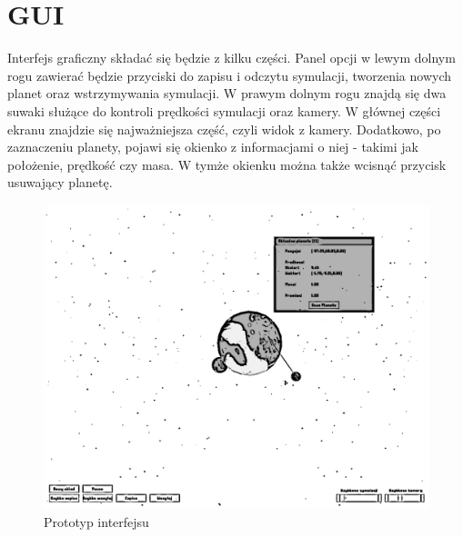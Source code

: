 \section{GUI}\label{sec:gui}

Interfejs graficzny składać się będzie z kilku części. Panel opcji w lewym dolnym rogu zawierać będzie przyciski do zapisu i odczytu symulacji, tworzenia nowych planet oraz wstrzymywania symulacji. W prawym dolnym rogu znajdą się dwa suwaki służące do kontroli prędkości symulacji oraz kamery. W głównej części ekranu znajdzie się najważniejsza część, czyli widok z kamery. Dodatkowo, po zaznaczeniu planety, pojawi się okienko z informacjami o niej - takimi jak położenie, prędkość czy masa. W tymże okienku można także wcisnąć przycisk usuwający planetę.

\begin{figure}[h]
	\centering
	\includegraphics[width=1.0\textwidth]{gui.png}
	\caption{Prototyp interfejsu}
	\label{fig:gui}
\end{figure}

